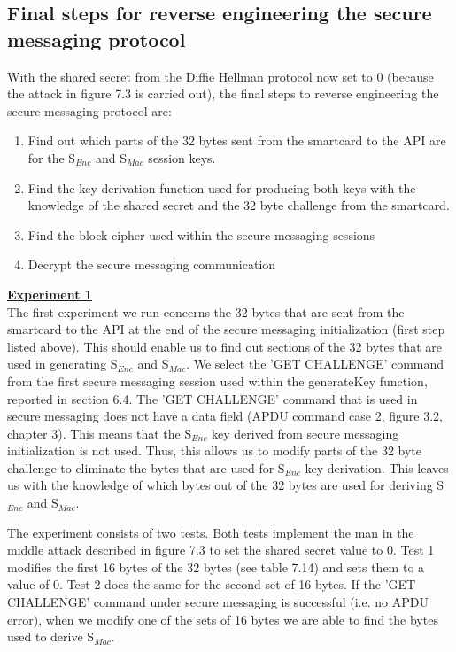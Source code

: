 \documentclass[bsc,frontabs,twoside,singlespacing,parskip,deptreport]{infthesis}     %
\begin{document}
\subsection{Final steps for reverse engineering the secure messaging protocol}
With the shared secret from the Diffie Hellman protocol now set to 0 (because the attack in figure 7.3 is carried out), the final steps to reverse engineering the secure messaging protocol are:
\begin{enumerate}

\item Find out which parts of the 32 bytes sent from the smartcard to the API are for the S$_{Enc}$ and S$_{Mac}$ session keys.
\item Find the key derivation function used for producing both keys with the knowledge of the shared secret and the 32 byte challenge from the smartcard.
\item Find the block cipher used within the secure messaging sessions
\item Decrypt the secure messaging communication\\
\end{enumerate}

\pagebreak
\underline{\textbf{Experiment 1}}\\

The first experiment we run concerns the 32 bytes that are sent from the smartcard to the API at the end of the secure messaging initialization (first step listed above). This should enable us to find out sections of the 32 bytes that are used in generating S$_{Enc}$ and S$_{Mac}$. We select the 'GET CHALLENGE' command from the first secure messaging session used within the generateKey function, reported in section 6.4. The 'GET CHALLENGE' command that is used in secure messaging does not have a data field (APDU command case 2, figure 3.2, chapter 3). This means that the S$_{Enc}$ key derived from secure messaging initialization is not used. Thus, this allows us to modify parts of the 32 byte challenge to eliminate the bytes that are used for S$_{Enc}$ key derivation. This leaves us with the knowledge of which bytes out of the 32 bytes are used for deriving S$_{Enc}$ and S$_{Mac}$.

The experiment consists of two tests. Both tests implement the man in the middle attack described in figure 7.3 to set the shared secret value to 0. Test 1 modifies the first 16 bytes of the 32 bytes (see table 7.14) and sets them to a value of 0. Test 2 does the same for the second set of 16 bytes. If the 'GET CHALLENGE' command under secure messaging is successful (i.e. no APDU error), when we modify one of the sets of 16 bytes we are able to find the bytes used to derive S$_{Mac}$.
\end{document}
